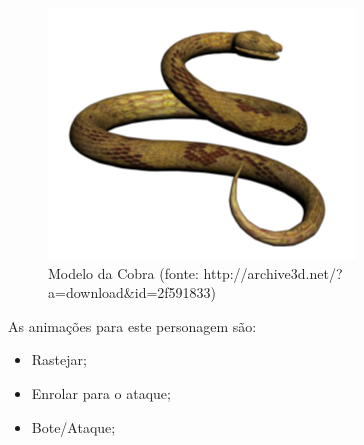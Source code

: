 \begin{itemize}
\begin{figure}[H]
 \centering
 \includegraphics[scale=0.7]{Imagens/cobra01.png}
 \caption{Modelo da Cobra (fonte: http://archive3d.net/?a=download\&id=2f591833)}
\label{img:cobra}
\end{figure}


As animações para este personagem são:
\begin{itemize}
\item Rastejar;
\item Enrolar para o ataque;
\item Bote/Ataque;
\end{itemize}
\end{itemize}

